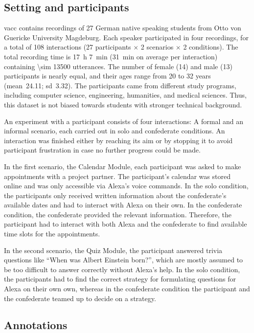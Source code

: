 \subsection{Setting and participants}
\label{subsec:setting_and_participants}

\ac{vacc} contains recordings of 27 German native speaking students from Otto von Guericke University Magdeburg.
Each speaker participated in four recordings, for a total of 108 interactions (27 participants $\times$ 2 scenarios $\times$ 2 conditions).
The total recording time is \SI{17}{\hour} \SI{7}{\minute} (\SI{31}{\minute} on average per interaction) containing \num{\sim 13500} utterances.
The number of female (14) and male (13) participants is nearly equal, and their ages range from 20 to 32 years (mean~24.11; sd~3.32).
The participants came from different study programs, including computer science, engineering, humanities, and medical sciences.
Thus, this dataset is not biased towards students with stronger technical background.

An experiment with a participant consists of four interactions:
A formal and an informal scenario, each carried out in solo and confederate conditions.
An interaction was finished either by reaching its aim or by stopping it to avoid participant frustration in case no further progress could be made.

In the first scenario, the Calendar Module, each participant was asked to make appointments with a project partner.
The participant's calendar was stored online and was only accessible via Alexa's voice commands.
In the solo condition, the participants only received written information about the confederate's available dates and had to interact with Alexa on their own.
In the confederate condition, the confederate provided the relevant information.
Therefore, the participant had to interact with both Alexa and the confederate to find available time slots for the appointments.

In the second scenario, the Quiz Module, the participant answered trivia questions like \enquote{When was Albert Einstein born?}, which are mostly assumed to be too difficult to answer correctly without Alexa's help.
In the solo condition, the participants had to find the correct strategy for formulating questions for Alexa on their own own, whereas in the confederate condition the participant and the confederate teamed up to decide on a strategy. 

\subsection{Annotations}
\label{subsec:annotations}

